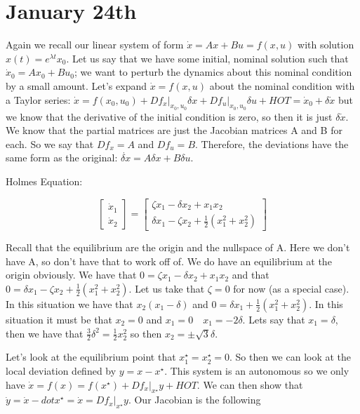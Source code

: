\documentclass[11pt]{article}
\begin{document}
\section*{January 24th}
Again we recall our linear system of form $\dot{x} = Ax + Bu = f(x,u)$ with solution $x(t) = e^{\lambda t}x_0$. Let us say that we have some initial, nominal solution such that $\dot{x}_0 = Ax_0 + Bu_0$; we want to perturb the dynamics about this nominal condition by a small amount. Let's expand $\dot{x} = f(x,u)$ about the nominal condition with a Taylor series: $\dot{x} = f(x_0,u_0) + Df_x \lvert_{x_0 , u_0} \delta x + Df_u \lvert_{x_0 , u_0} \delta u + HOT =  \dot{x}_0 + \delta \dot{x}$ but we know that the derivative of the initial condition is zero, so then it is just $\delta\dot{x}$. We know that the partial matrices are just the Jacobian matrices A and B for each. So we say that $Df_x = A$ and $Df_u = B$. Therefore, the deviations have the same form as the original: $\dot{\delta x} = A \delta x + B \delta u$.

Holmes Equation: 

\begin{equation}
\begin{bmatrix}
\dot{x}_1 \\
\dot{x}_2
\end{bmatrix}
 = 
\begin{bmatrix}
\zeta x_1 - \delta x_2 + x_1x_2 \\
\delta x_1 -\zeta x_2 + \frac{1}{2}(x_1^2 + x_2^2)
\end{bmatrix}
\end{equation}

Recall that the equilibrium are the origin and the nullspace of A. Here we don't have A, so don't have that to work off of. We do have an equilibrium at the origin obviously. We have that $0=\zeta x_1 - \delta x_2 + x_1x_2 $ and that $0=\delta x_1 -\zeta x_2 + \frac{1}{2}(x_1^2 + x_2^2)$. Let us take that $\zeta = 0$ for now (as a special case). In this situation we have that $x_2(x_1 - \delta)$ and $0=\delta x_1 + \frac{1}{2}(x_1^2 + x_2^2)$. In this situation it must be that $x_2 = 0$ and $x_1 = 0 \quad x_1 = -2\delta$. Lets say that $x_1 = \delta$, then we have that $\frac{3}{2}\delta^2 = \frac{1}{2}x_2^2$ so then $x_2 = \pm \sqrt{3}\delta$.

Let's look at the equilibrium point that $x_1^\star = x_2^\star = 0$. So then we can look at the local deviation defined by $y = x - x^\star$. This system is an autonomous so we only have $\dot{x} = f(x) = f(x^\star) + Df_x\lvert_{x^\star}y + HOT$. We can then show that $\dot{y} = \dot{x} - dot{x^\star} = \dot{x} = Df_x\lvert_{x^\star}y$. Our Jacobian is the following
\end{document}
